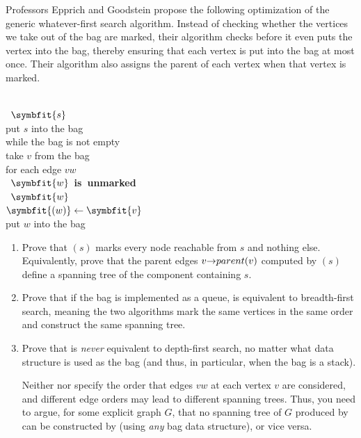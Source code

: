 \begin{exercises}
\item Professors Epprich and Goodstein propose the following optimization of the generic whatever-first search algorithm.
Instead of checking whether the vertices we take out of the bag are marked, their algorithm checks before it even puts the vertex into the bag, thereby ensuring that each vertex is put into the bag at most once.
Their algorithm also assigns the parent of each vertex when that vertex is marked.
\begin{pseudocode}
\\
\mbox{\color{JEred}{\bfseries mark} $\symbfit{s}$}\\
put $s$ into the bag\\
while the bag is not empty\\
\Indent take $v$ from the bag\\
\Indent for each edge $vw$\\
\Indent\Indent \mbox{\color{JEred}{\bfseries if} $\symbfit{w}$ {\bfseries is unmarked}}\\
\Indent\Indent\Indent \mbox{\color{JEred}{\bfseries mark} $\symbfit{w}$}\\
\Indent\Indent\Indent \mbox{\color{JEred}\mbox{\bfseries {}}$\symbfit{(w)} \gets \symbfit{v}$}\\
\Indent\Indent\Indent put $w$ into the bag
\end{pseudocode}
\begin{enumerate}
\item Prove that $(s)$ marks every node reachable from $s$ and nothing else.
Equivalently, prove that the parent edges $v\mathord{\rightarrow}parent(v)$ computed by $(s)$ define a spanning tree of the component containing $s$.
\item Prove that if the bag is implemented as a queue,  is equivalent to breadth-first search, meaning the two algorithms mark the same vertices in the same order and construct the same spanning tree.
\item Prove that  is \textit{never} equivalent to depth-first search, no matter what data structure is used as the bag (and thus, in particular, when the bag is a stack).

Neither  nor  specify the order that edges $vw$ at each vertex $v$ are considered, and different edge orders may lead to different spanning trees.
Thus, you need to argue, for some explicit graph $G$, that no spanning tree of $G$ produced by  can be constructed by  (using \textit{any} bag data structure), or vice versa.
\end{enumerate}


\end{exercises}
